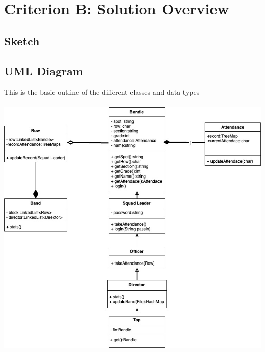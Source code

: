 \documentclass{article}
\begin{document}
	\section{Criterion B: Solution Overview}
		\subsection{Sketch}
		\subsection{UML Diagram}
			This is the basic outline of the different classes and data types \\ \\
			\includegraphics[width=6in]{IA UML and Flowchart-UML.jpg}
\end{document}
